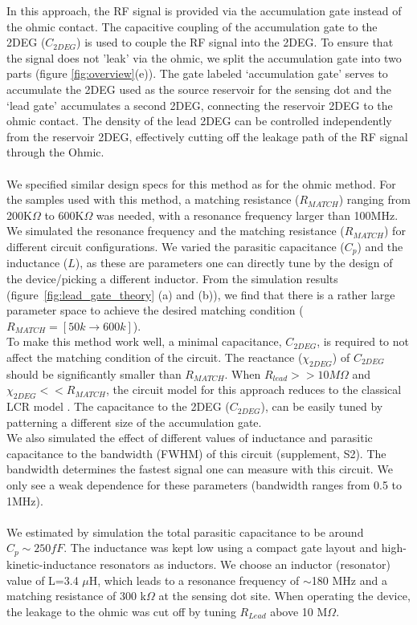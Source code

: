 \documentclass{article}
\begin{document}
	In this approach, the RF signal is provided via the accumulation gate\cite{Volk2019} instead of the ohmic contact. The capacitive coupling of the accumulation gate to the 2DEG ($C_{2DEG}$) is used to couple the RF signal into the 2DEG. To ensure that the signal does not 'leak' via the ohmic, we  split the accumulation gate into two parts (figure \ref{fig:overview}(e)).
	The gate labeled ‘accumulation gate’ serves to accumulate the 2DEG used as the source reservoir for the sensing dot and the ‘lead gate’ accumulates a second 2DEG, connecting the reservoir 2DEG to the ohmic contact. The density of the lead 2DEG can be controlled independently from the reservoir 2DEG, effectively cutting off the leakage path of the RF signal through the Ohmic.
	\\ \\
	We specified similar design specs for this method as for the ohmic method. For the samples used with this method, a matching resistance ($R_{MATCH}$) ranging from 200K$\Omega$ to 600K$\Omega$ was needed, with a resonance frequency larger than 100MHz. We simulated the resonance frequency and the matching resistance ($R_{MATCH}$) for different circuit configurations. We varied the parasitic capacitance ($C_p$) and the inductance ($L$), as these are parameters one can directly tune by the design of the device/picking a different inductor. From the simulation results (figure\ \ref{fig:lead_gate_theory} (a) and (b)), we find that there is a rather large parameter space to achieve the desired matching condition ($R_{MATCH} = [50k \rightarrow 600k]$).
	\\
	To make this method work well, a minimal capacitance, $C_{2DEG}$, is required to not affect the matching condition of the circuit. The reactance ($\chi_{2DEG}$) of $C_{2DEG}$ should be significantly smaller than $R_{MATCH}$. When $R_{lead} >> 10M\Omega$ and $\chi_{2DEG} << R_{MATCH}$, the circuit model for this approach reduces to the classical LCR model
	\cite{taskinen2008radio}. The capacitance to the 2DEG ($C_{2DEG}$), can be easily tuned by patterning a different size of the accumulation gate.
	\\
	We also simulated the effect of different values of inductance and parasitic capacitance to the bandwidth (FWHM) of this circuit (supplement, S2). The bandwidth determines the fastest signal one can measure with this circuit. We only see a weak dependence for these parameters (bandwidth ranges from 0.5 to 1MHz).
	\\ \\ 
	We estimated by simulation the total parasitic capacitance to be around $C_p \sim 250fF$. The inductance was kept low using a compact gate layout and high-kinetic-inductance resonators as inductors\cite{Samkharadze2016}. We choose an inductor (resonator) value of L=3.4 $\mu$H, which leads to a resonance frequency of $\sim$180 MHz and a matching resistance of 300 k$\Omega$ at the sensing dot site.
	When operating the device, the leakage to the ohmic was cut off by tuning $R_{Lead}$ above 10 M$\Omega$.
\end{document}
